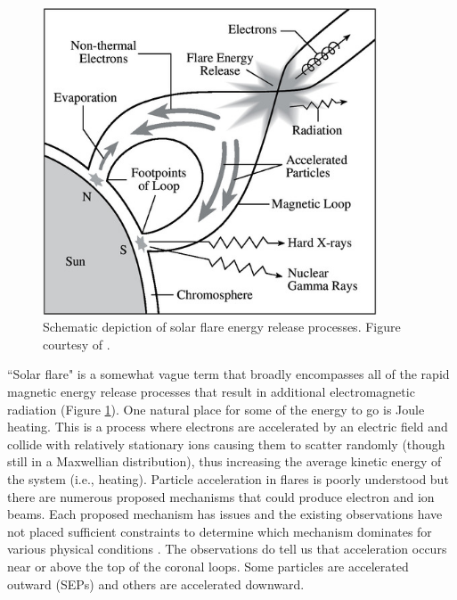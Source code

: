 \begin{figure}[!h]
    \begin{center}
	    \includegraphics[width=100mm]{Images/SolarFlareSchematic.png}
    \end{center}
    \caption[Solar flare schematic]{
        Schematic depiction of solar flare energy release processes. Figure courtesy of \citet{Lang2001}.
    }
    \label{fig:solarflareschematic}
\end{figure}

``Solar flare" is a somewhat vague term that broadly encompasses all of the rapid magnetic energy release processes that result in additional electromagnetic radiation (Figure \ref{fig:solarflareschematic}). One natural place for some of the energy to go is Joule heating. This is a process where electrons are accelerated by an electric field and collide with relatively stationary ions causing them to scatter randomly (though still in a Maxwellian distribution), thus increasing the average kinetic energy of the system (i.e., heating). Particle acceleration in flares is poorly understood but there are numerous proposed mechanisms that could produce electron and ion beams. Each proposed mechanism has issues and the existing observations have not placed sufficient constraints to determine which mechanism dominates for various physical conditions \citep{Kontar2011, Zharkova2011}. The observations do tell us that acceleration occurs near or above the top of the coronal loops. Some particles are accelerated outward (SEPs) and others are accelerated downward. 

